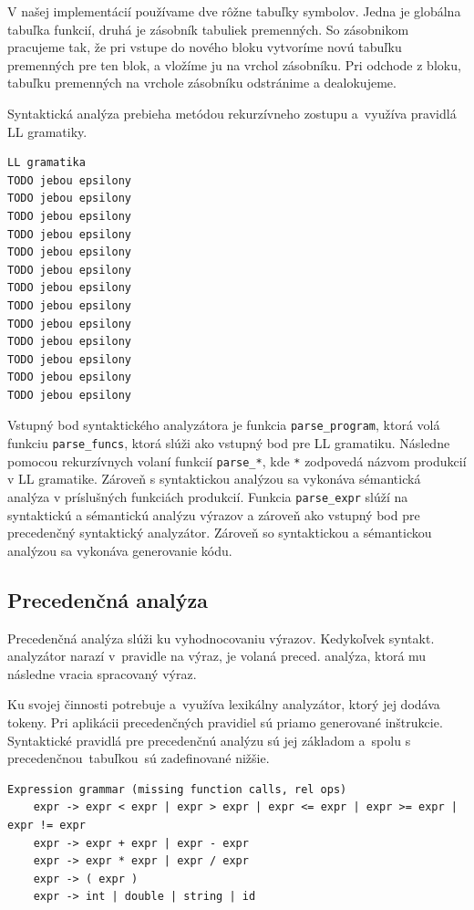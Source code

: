 \documentclass[12pt,a4paper,titlepage,final]{article}
\begin{document}
V našej implementácií používame dve rôžne tabuľky symbolov. Jedna je globálna tabuľka funkcií, druhá je zásobník tabuliek premenných. So zásobnikom pracujeme tak, že pri vstupe do nového bloku vytvoríme novú tabuľku premenných pre ten blok, a vložíme ju na vrchol zásobníku. Pri odchode z bloku, tabuľku premenných na vrchole zásobníku odstránime a dealokujeme.

Syntaktická analýza prebieha metódou rekurzívneho zostupu a využíva pravidlá LL gramatiky. 

\begin{verbatim}
LL gramatika 
TODO jebou epsilony
TODO jebou epsilony
TODO jebou epsilony
TODO jebou epsilony
TODO jebou epsilony
TODO jebou epsilony
TODO jebou epsilony
TODO jebou epsilony
TODO jebou epsilony
TODO jebou epsilony
TODO jebou epsilony
TODO jebou epsilony
TODO jebou epsilony

\end{verbatim}

Vstupný bod syntaktického analyzátora je funkcia \verb+parse_program+, ktorá volá funkciu \verb+parse_funcs+, ktorá slúži ako vstupný bod pre LL gramatiku. Následne pomocou rekurzívnych volaní funkcií \verb+parse_*+, kde \verb+*+ zodpovedá názvom produkcií v LL gramatike. Zároveň s syntaktickou analýzou sa vykonáva sémantická analýza v príslušných funkciách produkcií. Funkcia \verb+parse_expr+ slúží na syntaktickú a sémantickú analýzu výrazov a zároveň ako vstupný bod pre precedenčný syntaktický analyzátor. Zároveň so syntaktickou a sémantickou analýzou sa vykonáva generovanie kódu.

\subsection{Precedenčná analýza}

Precedenčná analýza slúži ku vyhodnocovaniu výrazov. Kedykoľvek syntakt. analyzátor narazí v pravidle na výraz, je volaná preced. analýza, ktorá mu následne vracia spracovaný výraz. 

Ku svojej činnosti potrebuje a využíva lexikálny analyzátor, ktorý jej dodáva tokeny. Pri aplikácii precedenčných pravidiel sú priamo generované inštrukcie. Syntaktické pravidlá pre precedenčnú analýzu sú jej základom a spolu s precedenčnou tabuľkou sú zadefinované nižšie. 
\begin{verbatim}
Expression grammar (missing function calls, rel ops)
	expr -> expr < expr | expr > expr | expr <= expr | expr >= expr | expr != expr
	expr -> expr + expr | expr - expr
	expr -> expr * expr | expr / expr
	expr -> ( expr )
	expr -> int | double | string | id
\end{verbatim}
\end{document}
